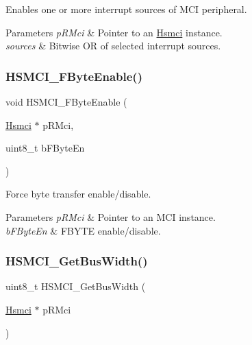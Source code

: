 Enables one or more interrupt sources of M\+CI peripheral. 


\begin{DoxyParams}{Parameters}
{\em p\+R\+Mci} & Pointer to an \mbox{\hyperlink{structHsmci}{Hsmci}} instance. \\
\hline
{\em sources} & Bitwise OR of selected interrupt sources. \\
\hline
\end{DoxyParams}
\mbox{\label{group__hsmci__functions_gafd512a0c9cecc6938fd1d9bbd182af9d}} 
\subsubsection{\texorpdfstring{HSMCI\_FByteEnable()}{HSMCI\_FByteEnable()}}
{\footnotesize\ttfamily void H\+S\+M\+C\+I\+\_\+\+F\+Byte\+Enable (\begin{DoxyParamCaption}\item[{\mbox{\hyperlink{structHsmci}{Hsmci}} $\ast$}]{p\+R\+Mci,  }\item[{uint8\+\_\+t}]{b\+F\+Byte\+En }\end{DoxyParamCaption})}



Force byte transfer enable/disable. 


\begin{DoxyParams}{Parameters}
{\em p\+R\+Mci} & Pointer to an M\+CI instance. \\
\hline
{\em b\+F\+Byte\+En} & F\+B\+Y\+TE enable/disable. \\
\hline
\end{DoxyParams}
\mbox{\label{group__hsmci__functions_ga552236fa96bc93916c7f87d3d1fd420f}} 
\subsubsection{\texorpdfstring{HSMCI\_GetBusWidth()}{HSMCI\_GetBusWidth()}}
{\footnotesize\ttfamily uint8\+\_\+t H\+S\+M\+C\+I\+\_\+\+Get\+Bus\+Width (\begin{DoxyParamCaption}\item[{\mbox{\hyperlink{structHsmci}{Hsmci}} $\ast$}]{p\+R\+Mci }\end{DoxyParamCaption})}




